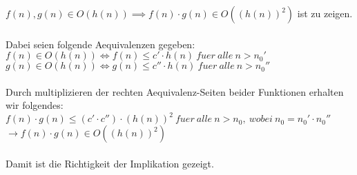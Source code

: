$f(n),g(n) \in O(h(n)) \implies f(n) \cdot g(n) \in O((h(n))^2)$ ist zu zeigen.\\\\
Dabei seien folgende Aequivalenzen gegeben:\\
$f(n) \in O(h(n)) \iff f(n) \leq c' \cdot h(n)\ fuer\ alle\ n > n_0'$\\
$g(n) \in O(h(n)) \iff g(n) \leq c'' \cdot h(n)\ fuer\ alle\ n > n_0''$\\\\
Durch multiplizieren der rechten Aequivalenz-Seiten beider Funktionen erhalten wir folgendes:\\
$f(n) \cdot g(n) \leq (c' \cdot c'') \cdot (h(n))^2\ fuer\ alle\ n > n_0,\ wobei\ n_0 = n_0' \cdot n_0''$\\
$\to f(n) \cdot g(n) \in O((h(n))^2)$\\\\
Damit ist die Richtigkeit der Implikation gezeigt.